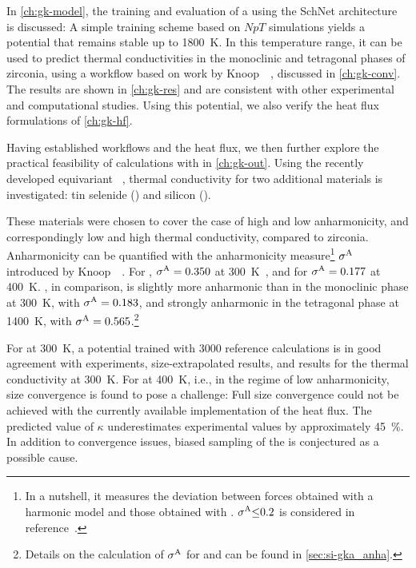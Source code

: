 In \cref{ch:gk-model}, the training and evaluation of a \glp using the SchNet architecture~\cite{sktm2017q,sstm2018q} is discussed: A simple training scheme based on $NpT$ \aimd simulations yields a potential that remains stable up to \qty{1800}{K}. In this temperature range, it can be used to predict thermal conductivities in the monoclinic and tetragonal phases of zirconia, using a workflow based on work by Knoop~\etal~\cite{ksc2023t}, discussed in \cref{ch:gk-conv}. The results are shown in \cref{ch:gk-res} and are consistent with other experimental and computational studies. Using this potential, we also verify the heat flux formulations of \cref{ch:gk-hf}.

Having established workflows and the heat flux, we then further explore the practical feasibility of \gk calculations with \glps in \cref{ch:gk-out}. Using the recently developed equivariant \sok \glp~\cite{fum2022q}, thermal conductivity for two additional materials is investigated: tin selenide () and silicon ().

\clearpage
These materials were chosen to cover the case of high and low anharmonicity, and correspondingly low and high thermal conductivity, compared to zirconia. Anharmonicity can be quantified with the anharmonicity measure\footnote{In a nutshell, it measures the deviation between forces obtained with a harmonic model and those obtained with \dft. $\sigma^{\text{A}}{\leq}0.2$ is considered  in reference~\cite{kpsc2020t}.} $\sigma^{\text{A}}$ introduced by Knoop~\etal~\cite{kpsc2020t}. For , $\sigma^{\text{A}}=0.350$ at \qty{300}{K}~\cite{k2021t}, and for  $\sigma^{\text{A}} = 0.177$ at \qty{400}{K}. , in comparison, is slightly more anharmonic than  in the monoclinic phase at \qty{300}{K}, with $\sigma^{\text{A}}=0.183$, and strongly anharmonic in the tetragonal phase at \qty{1400}{K}, with $\sigma^{\text{A}}=0.565$.\footnote{Details on the calculation of $\sigma^{\text{A}}$ for  and  can be found in \cref{sec:si-gka_anha}.} 

For  at \qty{300}{K}, a \sok potential trained with \num{3000} reference calculations is in good agreement with experiments, size-extrapolated \aigk results, and \mlp results for the thermal conductivity at \qty{300}{K}.
For  at \qty{400}{K}, i.e., in the regime of low anharmonicity, size convergence is found to pose a challenge: Full size convergence could not be achieved with the currently available implementation of the heat flux. The predicted value of $\kappa$ underestimates experimental values by approximately \qty{45}{\percent}. In addition to convergence issues, biased sampling of the \pes is conjectured as a possible cause.

